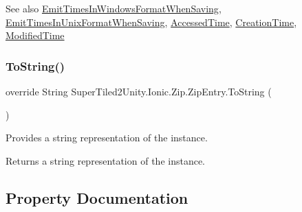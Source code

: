 \begin{DoxySeeAlso}{See also}
\mbox{\hyperlink{class_super_tiled2_unity_1_1_ionic_1_1_zip_1_1_zip_entry_affabc22ba72be27e9134676becddcec7}{Emit\+Times\+In\+Windows\+Format\+When\+Saving}}, \mbox{\hyperlink{class_super_tiled2_unity_1_1_ionic_1_1_zip_1_1_zip_entry_afd50bda347e67681780f32ebdba43f58}{Emit\+Times\+In\+Unix\+Format\+When\+Saving}}, \mbox{\hyperlink{class_super_tiled2_unity_1_1_ionic_1_1_zip_1_1_zip_entry_abc1a038c251f1ed0e2c1435a5bab23fd}{Accessed\+Time}}, \mbox{\hyperlink{class_super_tiled2_unity_1_1_ionic_1_1_zip_1_1_zip_entry_a38ef2ae810c3b89b1f23ebea918fb60e}{Creation\+Time}}, \mbox{\hyperlink{class_super_tiled2_unity_1_1_ionic_1_1_zip_1_1_zip_entry_a88021d72ea8b94c762388d92d74c2e0d}{Modified\+Time}}


\end{DoxySeeAlso}
\mbox{\label{class_super_tiled2_unity_1_1_ionic_1_1_zip_1_1_zip_entry_a032c7cdd397cb85f1050c98745103f48}} 
\subsubsection{\texorpdfstring{To\+String()}{ToString()}}
{\footnotesize\ttfamily override String Super\+Tiled2\+Unity.\+Ionic.\+Zip.\+Zip\+Entry.\+To\+String (\begin{DoxyParamCaption}{ }\end{DoxyParamCaption})}



Provides a string representation of the instance.

\begin{DoxyReturn}{Returns}
a string representation of the instance.
\end{DoxyReturn}


\subsection{Property Documentation}
\mbox{\label{class_super_tiled2_unity_1_1_ionic_1_1_zip_1_1_zip_entry_abc1a038c251f1ed0e2c1435a5bab23fd}} 
